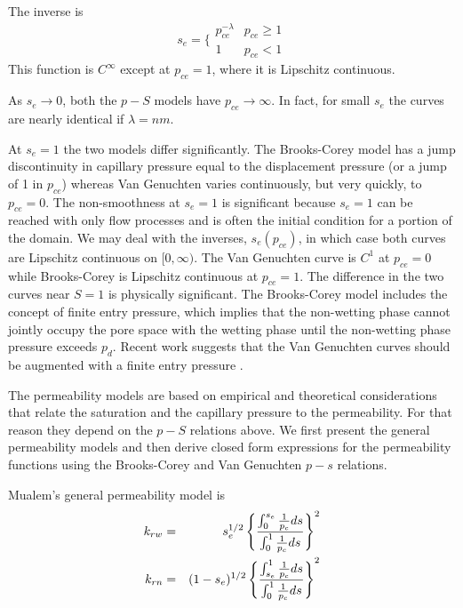 \documentclass[10pt,dvips,twoside,reqno]{amsart}
\begin{document}
The inverse is
\begin{equation}
s_e = \Big\{ \begin{array}{ll}
p_{ce}^{-\lambda} & p_{ce} \geq 1   \\
1 & p_{ce} < 1
\end{array}
\end{equation}
This function is $C^{\infty}$ except at $p_{ce}=1$, where it is
Lipschitz continuous.

 As $s_e \rightarrow 0$, both the $p-S$ models
have $p_{ce} \rightarrow \infty$.  In fact, for small $s_e$
the curves are nearly identical if $\lambda = nm$.

At $s_e=1$ the two models differ significantly. The Brooks-Corey model
has a jump discontinuity in capillary pressure equal to the
displacement pressure (or a jump of 1 in $p_{ce}$) whereas Van
Genuchten varies continuously, but very quickly, to $p_{ce}=0$. The
non-smoothness at $s_e=1$ is significant because $s_e=1$ can be
reached with only flow processes and is often the initial condition
for a portion of the domain. We may deal with the inverses,
$s_e(p_{ce})$, in which case both curves are Lipschitz continuous on
$[0,\infty)$. The Van Genuchten curve is  $C^1$ at $p_{ce}=0$
while Brooks-Corey is Lipschitz continuous at $p_{ce}=1$. The
difference in the two curves near $S=1$ is physically significant. The
Brooks-Corey model includes the concept of finite entry pressure,
which implies that the non-wetting phase cannot jointly occupy the
pore space with the wetting phase until the non-wetting phase pressure
exceeds $p_d$.  Recent work suggests that the Van Genuchten curves
should be augmented with a finite entry pressure
\citep{Gerhard_Kueper_03a,Gerhard_Kueper_03b}.

 The permeability models are based on
empirical and theoretical considerations that relate the saturation
and the capillary pressure to the permeability. For that reason they
depend on the $p-S$ relations above. We first present the general
permeability models and then derive closed form expressions for the
permeability functions using the Brooks-Corey and Van Genuchten $p-s$
relations.

 Mualem's general permeability model is
\citep{Mualem_76}
\begin{eqnarray}
k_{rw} &=& s_e^{1/2} \left\{ \frac{\int_0^{s_e} \frac{1}{p_c} ds }{\int_0^1 \frac{1}{p_c} ds } \right\}^2\\
k_{rn} &=& (1 - s_e)^{1/2} \left\{ \frac{\int_{s_e}^1 \frac{1}{p_c} ds }{ \int_0^1 \frac{1}{p_c} ds}  \right\}^2
\end{eqnarray}
\end{document}
